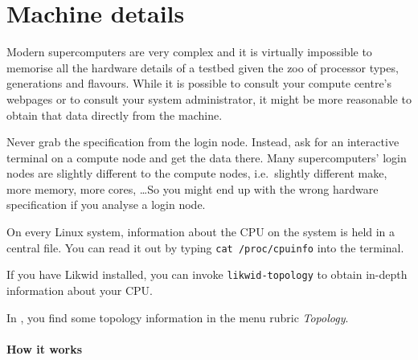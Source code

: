 \section{Machine details}
\label{section:preparation:machine}


Modern supercomputers are very complex and it is virtually impossible to
memorise all the hardware details of a testbed given the zoo of processor types,
generations and flavours.
While it is possible to consult your compute centre's webpages or to consult
your system administrator, it might be more reasonable to obtain that data
directly from the machine.

\begin{assessmentcrime}
 Never grab the specification from the login node. Instead, ask for an
 interactive terminal on a compute node and get the data there. Many
 supercomputers' login nodes are slightly different to the compute nodes,
 i.e.~slightly different make, more memory, more cores, \ldots So you might end
 up with the wrong hardware specification if you analyse a login node.
\end{assessmentcrime}

\begin{instructions}{\linux}
 On every Linux system, information about the CPU on the system is held in a
 central file.
 You can read it out by typing \texttt{cat /proc/cpuinfo} into the terminal.
\end{instructions}


\begin{instructions}{\likwid}
 If you have Likwid installed, you can invoke \texttt{likwid-topology} to obtain
 in-depth information about your CPU.
\end{instructions}

\begin{instructions}{\maqao}
 In \maqao, you find some topology information in the menu rubric \emph{Topology}. 
\end{instructions}


\paragraph*{How it works}

